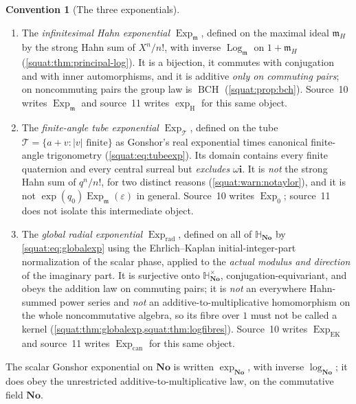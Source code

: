 \documentclass[11pt,letterpaper]{article}
\numberwithin{equation}{section}
\theoremstyle{definition}
\newtheorem{convention}[convention]{Convention}
\theoremstyle{remark}
\newcommand{\No}{\mathbf{No}}
\newcommand{\SQ}{\mathbb H_{\No}}
\newcommand{\mm}{\mathfrak m}
\newcommand{\eps}{\varepsilon}
\newcommand{\ii}{\mathbf i}
\newcommand{\Exp}{\operatorname{Exp}}
\newcommand{\Log}{\operatorname{Log}}
\newcommand{\Expm}{\Exp_{\mm}}
\newcommand{\Logm}{\Log_{\mm}}
\newcommand{\Expt}{\Exp_{\mathcal T}}
\newcommand{\Expr}{\Exp_{\mathrm{rad}}}
\newcommand{\BCH}{\operatorname{BCH}}
\newcommand{\abs}[1]{\left|#1\right|}
\begin{document}
\begin{convention}[The three exponentials]\label{squat:conv:exps}
\begin{enumerate}[label=\textup{(\alph*)},leftmargin=2.4em]
\item The \emph{infinitesimal Hahn exponential} $\Expm$, defined on the maximal ideal
$\mm_H$ by the strong Hahn sum of $X^n/n!$, with inverse $\Logm$ on $1+\mm_H$
(\cref{squat:thm:principal-log}). It is a bijection, it commutes with conjugation and
with inner automorphisms, and it is additive \emph{only on commuting pairs}; on
noncommuting pairs the group law is $\BCH$ (\cref{squat:prop:bch}). Source~10 writes
$\Exp_{\mm}$ and source~11 writes $\exp_{\mathrm H}$ for this same object.
\item The \emph{finite-angle tube exponential} $\Expt$, defined on the tube
$\mathcal T=\{a+v:\abs{v}\text{ finite}\}$ as Gonshor's real exponential times canonical
finite-angle trigonometry (\cref{squat:eq:tubeexp}). Its domain contains every finite
quaternion and every central surreal but \emph{excludes} $\omega\ii$. It is
\emph{not} the strong Hahn sum of $q^n/n!$, for two distinct reasons
(\cref{squat:warn:notaylor}), and it is not $\exp(q_0)\Expm(\eps)$ in general. Source~10
writes $\Exp_0$; source~11 does not isolate this intermediate object.
\item The \emph{global radial exponential} $\Expr$, defined on all of $\SQ$ by
\cref{squat:eq:globalexp} using the Ehrlich--Kaplan initial-integer-part normalization
of the scalar phase, applied to the \emph{actual modulus and direction} of the imaginary
part. It is surjective onto $\SQ^\times$, conjugation-equivariant, and obeys the
addition law on commuting pairs; it is \emph{not} an everywhere Hahn-summed power series and
\emph{not} an additive-to-multiplicative homomorphism on the whole noncommutative
algebra, so its fibre over $1$ must not be called a kernel
(\cref{squat:thm:globalexp,squat:thm:logfibres}). Source~10 writes $\Exp_{\mathrm{EK}}$
and source~11 writes $\Exp_{\mathrm{can}}$ for this same object.
\end{enumerate}
The scalar Gonshor exponential on $\No$ is written $\exp_{\No}$, with inverse
$\log_{\No}$; it does obey the unrestricted additive-to-multiplicative law, on the
commutative field $\No$.
\end{convention}
\end{document}
